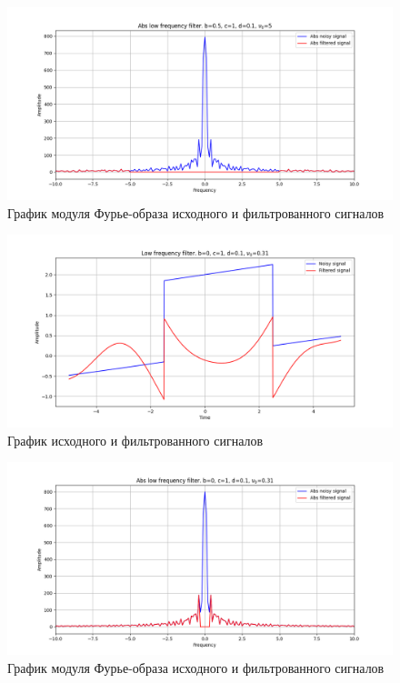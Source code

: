 \documentclass[a4paper, 12pt]{article}
\begin{document}
    \begin{figure}[!htb]
        \centering
        \includegraphics[scale=0.485]{14_abs_u_U_nolow.png}
        \captionsetup{skip=0pt}
        \caption{График модуля Фурье-образа исходного и фильтрованного сигналов}
        \label{fig:fig54}
    \end{figure}
    \begin{figure}[!htb]
        \centering
        \includegraphics[scale=0.485]{15_u_flt_u_nolow.png}
        \captionsetup{skip=0pt}
        \caption{График исходного и фильтрованного сигналов}
        \label{fig:fig55}
    \end{figure}
    \begin{figure}[!htb]
        \centering
        \includegraphics[scale=0.485]{15_abs_u_U_nolow.png}
        \captionsetup{skip=0pt}
        \caption{График модуля Фурье-образа исходного и фильтрованного сигналов}
        \label{fig:fig56}
    \end{figure}
\end{document}
